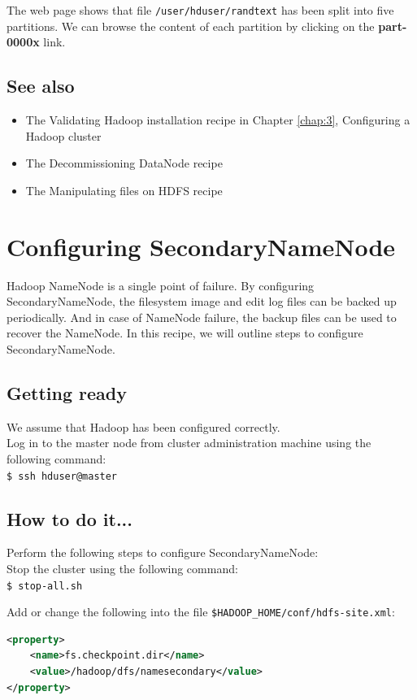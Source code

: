 The web page shows that file \verb|/user/hduser/randtext| has been split into five partitions. We can browse the content of each partition by clicking on the \textbf{part-0000x} link.
\subsection*{See also}
\begin{itemize}
  \item The Validating Hadoop installation recipe in Chapter \ref{chap:3}, Configuring a Hadoop cluster
  \item The Decommissioning DataNode recipe
  \item The Manipulating files on HDFS recipe
\end{itemize}

\section{Configuring SecondaryNameNode}
Hadoop NameNode is a single point of failure. By configuring SecondaryNameNode, the filesystem image and edit log files can be backed up periodically. And in case of NameNode failure, the backup files can be used to recover the NameNode. In this recipe, we will outline steps to configure SecondaryNameNode.
\subsection*{Getting ready}
We assume that Hadoop has been configured correctly.\\
Log in to the master node from cluster administration machine using the following command:\\
\verb|$ ssh hduser@master|

\subsection*{How to do it...}
Perform the following steps to configure SecondaryNameNode: \\
Stop the cluster using the following command: \\
\verb|$ stop-all.sh|

Add or change the following into the file \verb|$HADOOP_HOME/conf/hdfs-site.xml|: 
\begin{lstlisting}[language=XML]
<property>
    <name>fs.checkpoint.dir</name>
    <value>/hadoop/dfs/namesecondary</value>
</property>
\end{lstlisting}

